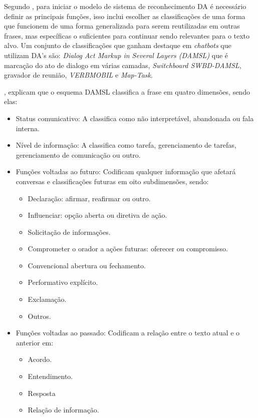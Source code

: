 \documentclass[
	12pt,				%
	oneside,
	a4paper,			%
	english,			%
	french,				%
	spanish,			%
	brazil				%
	]{abntex2}
\begin{document}
Segundo \textcite{da-recognition}, para iniciar o modelo de sistema de reconhecimento DA é necessário definir as principais funções, isso inclui escolher as classificações de uma forma que funcionem de uma forma generalizada para serem reutilizadas em outras frases, mas específicas o suficientes para continuar sendo relevantes para o texto alvo. Um conjunto de classificações que ganham destaque em \emph{chatbots} que utilizam DA's são: \emph{Dialog Act Markup in Several Layers (DAMSL)} que é  marcação do ato de dialogo em várias camadas, \emph{Switchboard SWBD-DAMSL}, gravador de reunião, \emph{VERBMOBIL} e \emph{Map-Task}.

\textcite{damsl}, explicam que o esquema DAMSL classifica a frase em quatro dimensões, sendo elas:

\begin{itemize}
	\item 
	Status comunicativo: A classifica como não interpretável, abandonada ou fala interna.
	\item 
	Nível de informação: A classifica como tarefa, gerenciamento de tarefas, gerenciamento de comunicação ou outro.
	\item 
	Funções voltadas ao futuro: Codificam qualquer informação que afetará conversas e classificações futuras em oito subdimensões, sendo:
	\begin{itemize}
		\item Declaração: afirmar, reafirmar ou outro.
		\item Influenciar: opção aberta ou diretiva de ação.
		\item Solicitação de informações.
		\item Comprometer o orador a ações futuras: oferecer ou compromisso.
		\item Convencional abertura ou fechamento.
		\item Performativo explícito.
		\item Exclamação.
		\item Outros.
	\end{itemize}
	\item Funções voltadas ao passado: Codificam a relação entre o texto atual e o anterior em:
	\begin{itemize}
		\item Acordo.
		\item Entendimento.
		\item Resposta
		\item Relação de informação.
	\end{itemize}

\end{itemize}
\end{document}
